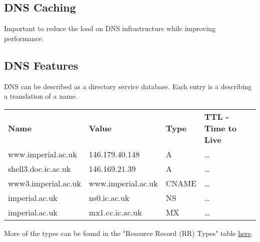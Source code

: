 \documentclass{report}
\begin{document}
\subsection*{DNS Caching}
Important to reduce the load on DNS infrastructure while improving performance.
\subsection*{DNS Features}
DNS can be described as a directory service database. Each entry is a  describing a translation of a name.
\begin{center}
	\begin{tabular}{l l l l}
		\textbf{Name}       & \textbf{Value}     & \textbf{Type} & \textbf{TTL - Time to Live} \\
		www.imperial.ac.uk  & 146.179.40.148     & A             & \dots                       \\
		shell3.doc.ic.ac.uk & 146.169.21.39      & A             & \dots                       \\
		www3.imperial.ac.uk & www.imperial.ac.uk & CNAME         & \dots                       \\
		imperial.ac.uk      & ns0.ic.ac.uk       & NS            & \dots                       \\
		imperial.ac.uk      & mx1.cc.ic.ac.uk    & MX            & \dots                       \\
	\end{tabular}
\end{center}
More of the types can be found in the "Resource Record (RR) Types" table \href{https://www.iana.org/assignments/dns-parameters/dns-parameters.xhtml}{here}.
\end{document}
